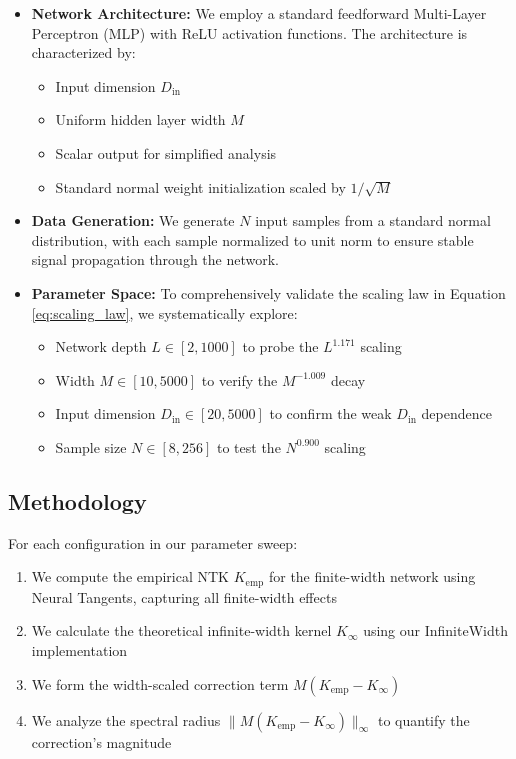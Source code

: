 \documentclass[a4paper]{article}
\begin{document}
\begin{itemize}
    \item \textbf{Network Architecture:} We employ a standard feedforward Multi-Layer Perceptron (MLP) with ReLU activation functions. The architecture is characterized by:
    \begin{itemize}
        \item Input dimension $D_{\text{in}}$
        \item Uniform hidden layer width $M$
        \item Scalar output for simplified analysis
        \item Standard normal weight initialization scaled by $1/\sqrt{M}$
    \end{itemize}

    \item \textbf{Data Generation:} We generate $N$ input samples from a standard normal distribution, with each sample normalized to unit norm to ensure stable signal propagation through the network.

    \item \textbf{Parameter Space:} To comprehensively validate the scaling law in Equation \ref{eq:scaling_law}, we systematically explore:
    \begin{itemize}
        \item Network depth $L \in [2, 1000]$ to probe the $L^{1.171}$ scaling
        \item Width $M \in [10, 5000]$ to verify the $M^{-1.009}$ decay
        \item Input dimension $D_{\text{in}} \in [20, 5000]$ to confirm the weak $D_{\text{in}}$ dependence
        \item Sample size $N \in [8, 256]$ to test the $N^{0.900}$ scaling
    \end{itemize}
\end{itemize}

\subsection{Methodology}

For each configuration in our parameter sweep:

\begin{enumerate}
    \item We compute the empirical NTK $K_{\text{emp}}$ for the finite-width network using Neural Tangents, capturing all finite-width effects
    \item We calculate the theoretical infinite-width kernel $K_{\infty}$ using our InfiniteWidth implementation
    \item We form the width-scaled correction term $M(K_{\text{emp}} - K_{\infty})$
    \item We analyze the spectral radius $\|M(K_{\text{emp}} - K_{\infty})\|_\infty$ to quantify the correction's magnitude
\end{enumerate}
\end{document}
